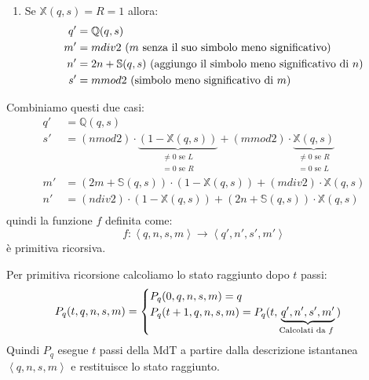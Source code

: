 \documentclass[a4paper]{article}
\begin{document}
\begin{theorem}
\begin{itemize}
\begin{enumerate}
      \item Se \( \mathbb{X}(q,s) = R = 1 \) allora:
        \[
          \begin{aligned}
            q' &= \mathbb{Q}(q,s)\\
            m' &= m div 2 \text{ (\( m \) senza il suo simbolo meno significativo)} \\
            n' &= 2n + \mathbb{S}(q,s) \text{ (aggiungo il simbolo meno significativo di \( n \))} \\
            s' &= m mod 2 \text{ (simbolo meno significativo di \( m \))}
          \end{aligned}
        \] 
    \end{enumerate}
    Combiniamo questi due casi:
    \[
      \begin{aligned}
        q' &= \mathbb{Q}(q,s)\\
        s' &= (n mod 2) \cdot \underbrace{(1 - \mathbb{X}(q,s))}_{\begin{aligned}
          \neq 0 \text{ se } L \\
          = 0 \text{ se } R
        \end{aligned}}
        + (m mod 2) \cdot \underbrace{\mathbb{X}(q,s)}_{\begin{aligned}
          \neq 0 \text{ se } R \\
          = 0 \text{ se } L
        \end{aligned}}\\
            m' &= (2m + \mathbb{S}(q,s)) \cdot (1 - \mathbb{X}(q,s)) + (m div 2) \cdot \mathbb{X}(q,s)\\
            n' &= (n div 2) \cdot (1 - \mathbb{X}(q,s)) + (2n + \mathbb{S}(q,s)) \cdot \mathbb{X}(q,s)\\
      \end{aligned}
    \] 
    quindi la funzione \( f \) definita come:
    \[
      f: \left<q, n, s, m \right> \to \left<q', n', s', m' \right>
    \] 
    è primitiva ricorsiva.

    \vspace{1em}
    \noindent
    Per primitiva ricorsione calcoliamo lo stato raggiunto dopo \( t \) passi:
    \[
      P_q(t, q, n, s, m) =
      \begin{cases}
        P_q(0, q, n, s, m) = q \\
        P_q(t+1, q, n, s, m) = P_q(t, \underbrace{q', n', s', m'}_{\text{Calcolati da \( f \) }})
      \end{cases}
    \]
    Quindi \( P_q \) esegue \( t \) passi della MdT a partire dalla descrizione istantanea
    \( \left<q, n, s, m \right> \) e restituisce lo stato raggiunto.


\end{itemize}
\end{theorem}
\end{document}
